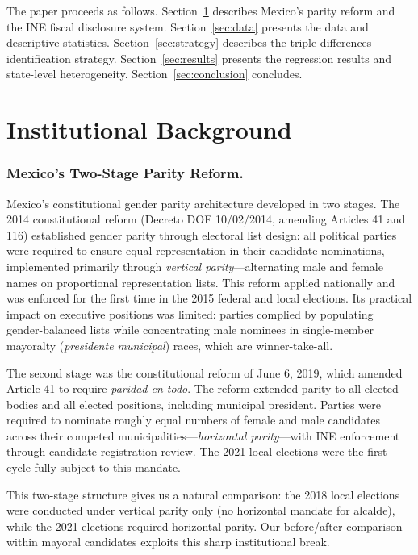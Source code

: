 \documentclass[12pt]{article}
\begin{document}
The paper proceeds as follows. Section~\ref{sec:background} describes Mexico's parity reform and the INE fiscal disclosure system. Section~\ref{sec:data} presents the data and descriptive statistics. Section~\ref{sec:strategy} describes the triple-differences identification strategy. Section~\ref{sec:results} presents the regression results and state-level heterogeneity. Section~\ref{sec:conclusion} concludes.

\section{Institutional Background}
\label{sec:background}

\subsubsection*{Mexico's Two-Stage Parity Reform.}
Mexico's constitutional gender parity architecture developed in two stages. The 2014 constitutional reform (Decreto DOF 10/02/2014, amending Articles 41 and 116) established gender parity through electoral list design: all political parties were required to ensure equal representation in their candidate nominations, implemented primarily through \emph{vertical parity}---alternating male and female names on proportional representation lists. This reform applied nationally and was enforced for the first time in the 2015 federal and local elections. Its practical impact on executive positions was limited: parties complied by populating gender-balanced lists while concentrating male nominees in single-member mayoralty (\textit{presidente municipal}) races, which are winner-take-all.

The second stage was the constitutional reform of June 6, 2019, which amended Article 41 to require \emph{paridad en todo}. The reform extended parity to all elected bodies and all elected positions, including municipal president. Parties were required to nominate roughly equal numbers of female and male candidates across their competed municipalities---\emph{horizontal parity}---with INE enforcement through candidate registration review. The 2021 local elections were the first cycle fully subject to this mandate.

This two-stage structure gives us a natural comparison: the 2018 local elections were conducted under vertical parity only (no horizontal mandate for alcalde), while the 2021 elections required horizontal parity. Our before/after comparison within mayoral candidates exploits this sharp institutional break.
\end{document}
